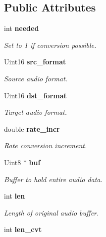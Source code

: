 \subsection*{Public Attributes}
\begin{DoxyCompactItemize}
\item 
int {\bf needed}\label{struct_s_d_l___audio_c_v_t_ac600a035a48df05e14d3712fd6953ad4}

\begin{DoxyCompactList}\small\item\em Set to 1 if conversion possible. \end{DoxyCompactList}\item 
Uint16 {\bf src\+\_\+format}\label{struct_s_d_l___audio_c_v_t_a06215f053474c02d9292b6c317af435c}

\begin{DoxyCompactList}\small\item\em Source audio format. \end{DoxyCompactList}\item 
Uint16 {\bf dst\+\_\+format}\label{struct_s_d_l___audio_c_v_t_a2388a295604af1169651568742de928d}

\begin{DoxyCompactList}\small\item\em Target audio format. \end{DoxyCompactList}\item 
double {\bf rate\+\_\+incr}\label{struct_s_d_l___audio_c_v_t_ad886122c23a6673073baace31bff3b6c}

\begin{DoxyCompactList}\small\item\em Rate conversion increment. \end{DoxyCompactList}\item 
Uint8 $\ast$ {\bf buf}\label{struct_s_d_l___audio_c_v_t_a080db27b929efa983c5161360ffce310}

\begin{DoxyCompactList}\small\item\em Buffer to hold entire audio data. \end{DoxyCompactList}\item 
int {\bf len}\label{struct_s_d_l___audio_c_v_t_aeaeb8c5a63c3ab96471fbfdf412c78ff}

\begin{DoxyCompactList}\small\item\em Length of original audio buffer. \end{DoxyCompactList}\item 
int {\bf len\+\_\+cvt}\label{struct_s_d_l___audio_c_v_t_a5c60163f34d1947e5b166c23aba9879d}


\end{DoxyCompactItemize}

